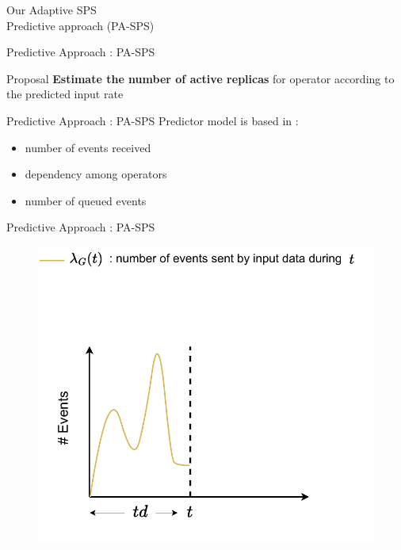\begin{frame}[noframenumbering]
	\centering
	\huge Our Adaptive SPS \\ Predictive approach (PA-SPS)
\end{frame}


\begin{frame}{Predictive Approach : PA-SPS}
	\begin{block}{Proposal}
		\textbf{Estimate the number of active replicas} for operator according to the predicted input rate
	\end{block}
\end{frame}

\begin{frame}{Predictive Approach : PA-SPS}
	Predictor model is based in : 
	\begin{itemize}
		\item number of events received
		\item dependency among operators
		\item number of queued events
	\end{itemize}
\end{frame}

\begin{frame}{Predictive Approach : PA-SPS}
\begin{figure}
    \centering
    \includegraphics[scale=0.63]{images/concepts/predictive/PA-SPS-Prediction-1.pdf}
\end{figure}
\end{frame}

